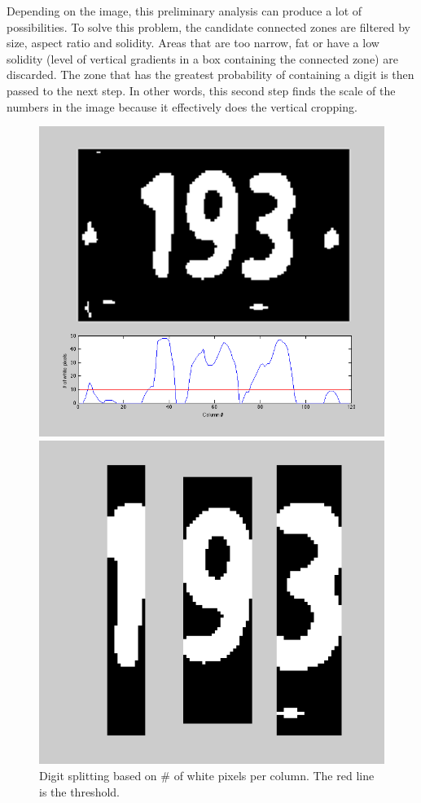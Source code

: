 \documentclass{article} %
\begin{document}
Depending on the image, this preliminary analysis can produce a lot of possibilities. To solve this problem, the candidate connected zones are filtered by size, aspect ratio and solidity. Areas that are too narrow, fat or have a low solidity (level of vertical gradients in a box containing the connected zone) are discarded. The zone that has the greatest probability of containing a digit is then passed to the next step. In other words, this second step finds the scale of the numbers in the image because it effectively does the vertical cropping.

\begin{figure}[!htb]
  \includegraphics[width=\linewidth]{images/image08}
  \caption{Digit splitting based on # of white pixels per column. The red line is the threshold.}
  \label{fig:thres}
\endminipage\hfill
{}
  \includegraphics[width=\linewidth]{images/image04}

\end{figure}
\end{document}

